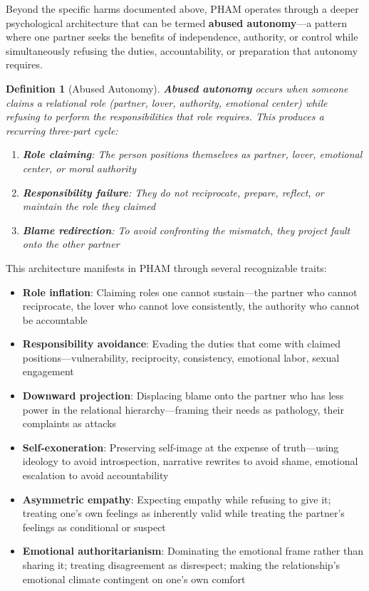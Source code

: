 \documentclass[12pt,openany]{book}
\newtheorem{definition}{Definition}[chapter]
\numberwithin{equation}{chapter}
\begin{document}
Beyond the specific harms documented above, PHAM operates through a deeper psychological architecture that can be termed \textbf{abused autonomy}---a pattern where one partner seeks the benefits of independence, authority, or control while simultaneously refusing the duties, accountability, or preparation that autonomy requires.

\begin{definition}[Abused Autonomy]
\textbf{Abused autonomy} occurs when someone claims a relational role (partner, lover, authority, emotional center) while refusing to perform the responsibilities that role requires. This produces a recurring three-part cycle:
\begin{enumerate}
    \item \textbf{Role claiming}: The person positions themselves as partner, lover, emotional center, or moral authority
    \item \textbf{Responsibility failure}: They do not reciprocate, prepare, reflect, or maintain the role they claimed
    \item \textbf{Blame redirection}: To avoid confronting the mismatch, they project fault onto the other partner
\end{enumerate}
\end{definition}

This architecture manifests in PHAM through several recognizable traits:

\begin{itemize}
    \item \textbf{Role inflation}: Claiming roles one cannot sustain---the partner who cannot reciprocate, the lover who cannot love consistently, the authority who cannot be accountable
    
    \item \textbf{Responsibility avoidance}: Evading the duties that come with claimed positions---vulnerability, reciprocity, consistency, emotional labor, sexual engagement
    
    \item \textbf{Downward projection}: Displacing blame onto the partner who has less power in the relational hierarchy---framing their needs as pathology, their complaints as attacks
    
    \item \textbf{Self-exoneration}: Preserving self-image at the expense of truth---using ideology to avoid introspection, narrative rewrites to avoid shame, emotional escalation to avoid accountability
    
    \item \textbf{Asymmetric empathy}: Expecting empathy while refusing to give it; treating one's own feelings as inherently valid while treating the partner's feelings as conditional or suspect
    
    \item \textbf{Emotional authoritarianism}: Dominating the emotional frame rather than sharing it; treating disagreement as disrespect; making the relationship's emotional climate contingent on one's own comfort
\end{itemize}
\end{document}
